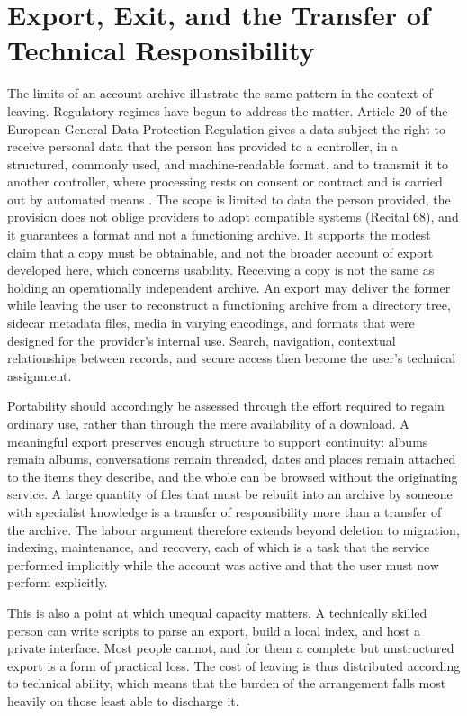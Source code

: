 \documentclass[12pt]{article}
\begin{document}
\section{Export, Exit, and the Transfer of Technical Responsibility}

The limits of an account archive illustrate the same pattern in the context of leaving. Regulatory regimes have begun to address the matter. Article 20 of the European General Data Protection Regulation gives a data subject the right to receive personal data that the person has provided to a controller, in a structured, commonly used, and machine-readable format, and to transmit it to another controller, where processing rests on consent or contract and is carried out by automated means \cite{gdpr2016}. The scope is limited to data the person provided, the provision does not oblige providers to adopt compatible systems (Recital 68), and it guarantees a format and not a functioning archive. It supports the modest claim that a copy must be obtainable, and not the broader account of export developed here, which concerns usability. Receiving a copy is not the same as holding an operationally independent archive. An export may deliver the former while leaving the user to reconstruct a functioning archive from a directory tree, sidecar metadata files, media in varying encodings, and formats that were designed for the provider's internal use. Search, navigation, contextual relationships between records, and secure access then become the user's technical assignment.

Portability should accordingly be assessed through the effort required to regain ordinary use, rather than through the mere availability of a download. A meaningful export preserves enough structure to support continuity: albums remain albums, conversations remain threaded, dates and places remain attached to the items they describe, and the whole can be browsed without the originating service. A large quantity of files that must be rebuilt into an archive by someone with specialist knowledge is a transfer of responsibility more than a transfer of the archive. The labour argument therefore extends beyond deletion to migration, indexing, maintenance, and recovery, each of which is a task that the service performed implicitly while the account was active and that the user must now perform explicitly.

This is also a point at which unequal capacity matters. A technically skilled person can write scripts to parse an export, build a local index, and host a private interface. Most people cannot, and for them a complete but unstructured export is a form of practical loss. The cost of leaving is thus distributed according to technical ability, which means that the burden of the arrangement falls most heavily on those least able to discharge it.
\end{document}
